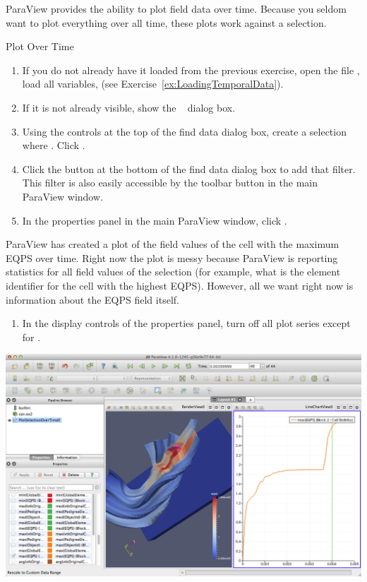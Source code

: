 ParaView provides the ability to plot field data over time.  Because you
seldom want to plot everything over all time, these plots work against a
selection.

\begin{exercise}{Plot Over Time}
  \label{ex:PlotOverTime}
  \begin{enumerate}
  \item If you do not already have it loaded from the previous exercise,
    open the file , load all variables, \apply (see
    Exercise~\ref{ex:LoadingTemporalData}).
  \item If it is not already visible, show the ~\findData
    dialog box.
  \item Using the controls at the top of the find data dialog box, create a
    selection where  . Click .
  \item Click the  button at the bottom of
    the find data dialog box to add that filter. This filter is also easily
    accessible by the \plotSelectionOverTime toolbar button in the main
    ParaView window.
  \item In the properties panel in the main ParaView window, click \apply.
    \savecounter
  \end{enumerate}

  ParaView has created a plot of the field values of the cell with the
  maximum EQPS over time. Right now the plot is messy because ParaView is
  reporting statistics for all field values of the selection (for example,
  what is the element identifier for the cell with the highest
  EQPS). However, all we want right now is information about the EQPS field
  itself.

  \begin{enumerate}
    \restorecounter
  \item In the display controls of the properties panel, turn off all plot
    series except for .
  \end{enumerate}

  \begin{inlinefig}
    \includegraphics[width=\scw]{images/PlotSelectionOverTime}
  \end{inlinefig}


\end{exercise}
